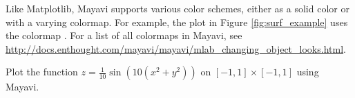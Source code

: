 Like Matplotlib, Mayavi supports various color schemes, either as a solid color or with a varying colormap.
For example, the plot in Figure \ref{fig:surf_example} uses the colormap .
For a list of all colormaps in Mayavi, see \url{http://docs.enthought.com/mayavi/mayavi/mlab_changing_object_looks.html}.

\begin{problem}
Plot the function $z = \frac{1}{10}\sin(10(x^2+y^2))$ on $[-1,1] \times [-1,1]$ using Mayavi.
\end{problem}

